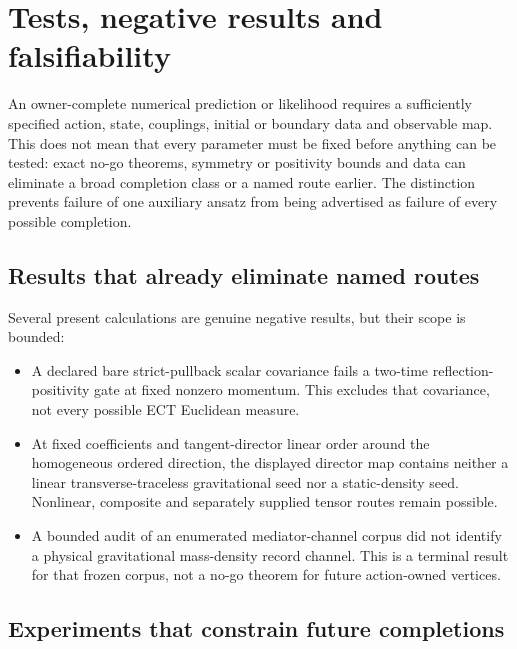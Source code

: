 \documentclass[11pt,a4paper]{article}
\begin{document}
\normalsize

\section{Tests, negative results and falsifiability}
\label{sec:tests}

An owner-complete numerical prediction or likelihood requires a sufficiently
specified action, state, couplings, initial or boundary data and observable
map.  This does not mean that every parameter must be fixed before anything
can be tested: exact no-go theorems, symmetry or positivity bounds and data can
eliminate a broad completion class or a named route earlier.  The distinction
prevents failure of one auxiliary ansatz from being advertised as failure of
every possible completion.

\subsection{Results that already eliminate named routes}

Several present calculations are genuine negative results, but their scope is
bounded:
\begin{itemize}[leftmargin=1.4em,itemsep=2pt]
\item A declared bare strict-pullback scalar covariance fails a two-time
reflection-positivity gate at fixed nonzero momentum.  This excludes that
covariance, not every possible ECT Euclidean measure.
\item At fixed coefficients and tangent-director linear order around the
homogeneous ordered direction, the displayed director map contains neither a
linear transverse-traceless gravitational seed nor a static-density seed.
Nonlinear, composite and separately supplied tensor routes remain possible.
\item A bounded audit of an enumerated mediator-channel corpus did not identify
a physical gravitational mass-density record channel.  This is a terminal
result for that frozen corpus, not a no-go theorem for future action-owned
vertices.
\end{itemize}

\subsection{Experiments that constrain future completions}
\end{document}
